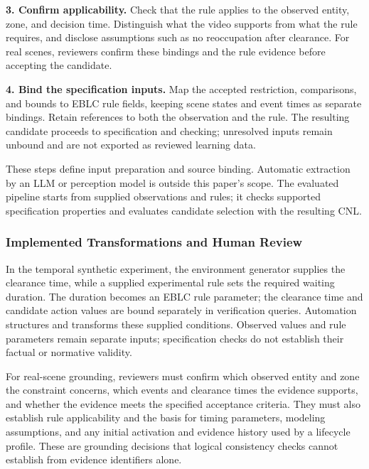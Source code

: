 \documentclass[nolineno]{ieeeaccess}
\begin{document}
\textbf{3. Confirm applicability.} Check that the rule applies to the observed entity, zone, and decision time. Distinguish what the video supports from what the rule requires, and disclose assumptions such as no reoccupation after clearance. For real scenes, reviewers confirm these bindings and the rule evidence before accepting the candidate.\par

\textbf{4. Bind the specification inputs.} Map the accepted restriction, comparisons, and bounds to EBLC rule fields, keeping scene states and event times as separate bindings. Retain references to both the observation and the rule. The resulting candidate proceeds to specification and checking; unresolved inputs remain unbound and are not exported as reviewed learning data.\par

These steps define input preparation and source binding. Automatic extraction by an LLM or perception model is outside this paper's scope. The evaluated pipeline starts from supplied observations and rules; it checks supported specification properties and evaluates candidate selection with the resulting CNL.\par

\subsubsection{Implemented Transformations and Human Review}

In the temporal synthetic experiment, the environment generator supplies the clearance time, while a supplied experimental rule sets the required waiting duration. The duration becomes an EBLC rule parameter; the clearance time and candidate action values are bound separately in verification queries. Automation structures and transforms these supplied conditions. Observed values and rule parameters remain separate inputs; specification checks do not establish their factual or normative validity.\par

For real-scene grounding, reviewers must confirm which observed entity and zone the constraint concerns, which events and clearance times the evidence supports, and whether the evidence meets the specified acceptance criteria. They must also establish rule applicability and the basis for timing parameters, modeling assumptions, and any initial activation and evidence history used by a lifecycle profile. These are grounding decisions that logical consistency checks cannot establish from evidence identifiers alone.\par
\end{document}
